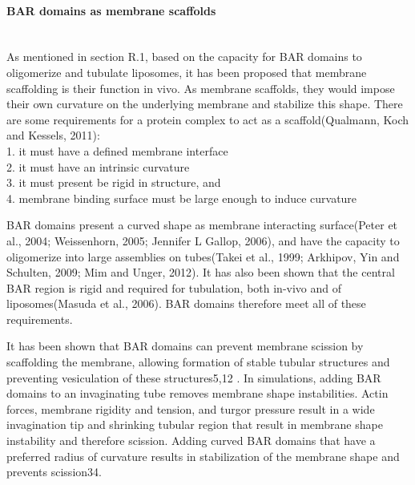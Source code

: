 				
			




\newpage
			\paragraph{BAR domains as membrane scaffolds}
				\mbox{}\\
As mentioned in section R.1, based on the capacity for BAR domains to oligomerize and tubulate liposomes, it has been proposed that membrane scaffolding is their function in vivo. As membrane scaffolds, they would impose their own curvature on the underlying membrane and stabilize this shape. There are some requirements for a protein complex to act as a scaffold(Qualmann, Koch and Kessels, 2011):\\
	1. it must have a defined membrane interface\\
	2. it must have an intrinsic curvature\\
	3. it must present be rigid in structure, and\\
	4. membrane binding surface must be large enough to induce curvature\\

\vspace{-1mm}

BAR domains present a curved shape as membrane interacting surface(Peter et al., 2004; Weissenhorn, 2005; Jennifer L Gallop, 2006), and have the capacity to oligomerize into large assemblies on tubes(Takei et al., 1999; Arkhipov, Yin and Schulten, 2009; Mim and Unger, 2012). It has also been shown that the central BAR region is rigid and required for tubulation, both in-vivo and of liposomes(Masuda et al., 2006). BAR domains therefore meet all of these requirements. 

	
It has been shown that BAR domains can prevent membrane scission by scaffolding the membrane, allowing formation of stable tubular structures and preventing vesiculation of these structures5,12 . In simulations, adding BAR domains to an invaginating tube removes membrane shape instabilities. Actin forces, membrane rigidity and tension, and turgor pressure result in a wide invagination tip and shrinking tubular region that result in membrane shape instability and therefore scission. Adding curved BAR domains that have a preferred radius of curvature results in stabilization of the membrane shape and prevents scission34.

